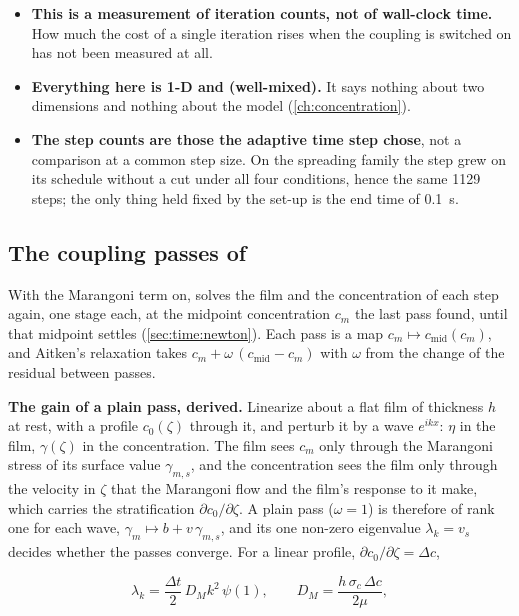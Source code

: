 \begin{itemize}
  \item \textbf{This is a measurement of iteration counts, not of wall-clock
    time.} How much the cost of a single iteration rises when the coupling is
    switched on has not been measured at all.
  \item \textbf{Everything here is 1-D and  (well-mixed).} It says
    nothing about two dimensions and nothing about the  model
    (\cref{ch:concentration}).
  \item \textbf{The step counts are those the adaptive time step chose}, not
    a comparison at a common step size. On the spreading family the step
    grew on its schedule without a cut under all four conditions, hence the
    same 1129 steps; the only thing held fixed by the set-up is the end time
    of \SI{0.1}{\second}.
\end{itemize}

\subsection{The coupling passes of \texorpdfstring{}{CZ}}
\label{sec:verification:czpasses}

With the Marangoni term on,  solves the film and the concentration
of each step again, one stage each, at the midpoint concentration $c_m$ the
last pass found, until that midpoint settles
(\cref{sec:time:newton}). Each pass is a map $c_m \mapsto c_{\mathrm{mid}}(c_m)$,
and Aitken's relaxation takes $c_m + \omega\,(c_{\mathrm{mid}} - c_m)$ with
$\omega$ from the change of the residual between passes.

\textbf{The gain of a plain pass, derived.} Linearize about a flat film of
thickness $h$ at rest, with a profile $c_0(\zeta)$ through it, and perturb it
by a wave $e^{ikx}$: $\eta$ in the film, $\gamma(\zeta)$ in the
concentration. The film sees $c_m$ only through the Marangoni stress of its
surface value $\gamma_{m,s}$, and the concentration sees the film only through
the velocity in $\zeta$ that the Marangoni flow and the film's response to it
make, which carries the stratification $\partial c_0/\partial\zeta$. A plain
pass ($\omega = 1$) is therefore of rank one for each wave,
$\gamma_m \mapsto b + v\,\gamma_{m,s}$, and its one non-zero eigenvalue
$\lambda_k = v_s$ decides whether the passes converge. For a linear profile,
$\partial c_0/\partial\zeta = \Delta c$,

\begin{equation}\label{eq:cz-gain}
  \lambda_k = \frac{\Delta t}{2}\,D_M k^2\,\psi(1), \qquad
  D_M = \frac{h\,\sigma_c\,\Delta c}{2\mu},
\end{equation}

